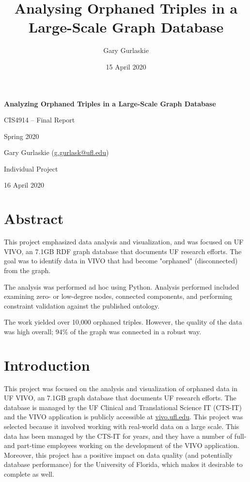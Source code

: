 \documentclass[11pt]{article}
\title{Analysing Orphaned Triples in a Large-Scale Graph Database}
\author{Gary Gurlaskie}
\date{15 April 2020}
\begin{document}
\begin{titlepage}
 \centering
 \vspace*{1in}
 \begin{Large}\bfseries
  Analyzing Orphaned Triples in a Large-Scale Graph Database\par
 \end{Large}

 \vspace*{0.2in}

  CIS4914 -- Final Report\par
  Spring 2020\par

  \vspace*{0.2in}
  
  Gary Gurlaskie (\url{g.gurlask@ufl.edu})\par
  Individual Project\par
  16 April 2020\par
\end{titlepage}

\section*{Abstract}
This project emphasized data analysis and visualization, and was focused on UF VIVO, an 7.1GB RDF graph database that documents UF research efforts. The goal was to identify data in VIVO that had become "orphaned" (disconnected) from the graph.

The analysis was performed ad hoc using Python. Analysis performed included examining zero- or low-degree nodes, connected components, and performing constraint validation against the published ontology.

The work yielded over 10,000 orphaned triples. However, the quality of the data was high overall; 94\% of the graph was connected in a robust way.

\section*{Introduction}
This project was focused on the analysis and visualization of orphaned data in UF VIVO, an 7.1GB graph database that documents UF research efforts. The database is managed by the UF Clinical and Translational Science IT (CTS-IT) and the VIVO application is publicly accessible at \url{vivo.ufl.edu}. This project was selected because it involved working with real-world data on a large scale. This data has been managed by the CTS-IT for years, and they have a number of full- and part-time employees working on the development of the VIVO application. Moreover, this project has a positive impact on data quality (and potentially database performance) for the University of Florida, which makes it desirable to complete as well.
\end{document}
